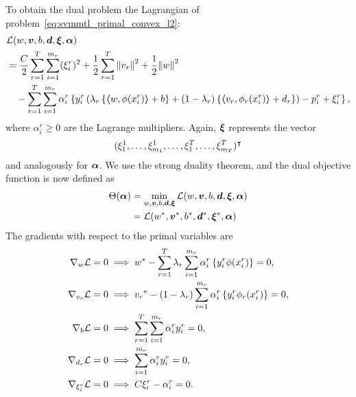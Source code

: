  To obtain the dual problem the Lagrangian of problem~\eqref{eq:svmmtl_primal_convex_l2}:
\begin{equation}\label{eq:svmmtl_lagrangian_convex_l2}
    \begin{aligned}
        & \lagr({w}, \fv{v}, b, \fv{d}, \fv{\xi}, \fv{\alpha}) \\
        &=  \frac{C}{2} \sum_{r= 1}^T \sum_{i=1}^{m_r} ({\xi_{i}^r})^2 + \frac{1}{2} \sum_{r= 1}^T{\norm{{v}_r}^2} + \frac{1}{2} {\norm{{w}}}^2 \\
        &\quad -  \sum_{r= 1}^T \sum_{i=1}^{m_r} \alpha_i^r \left\lbrace y_{i}^r  \left(\lambda_r \left\lbrace \dotp{w}{\phi(x_{i}^r)} + b  \right\rbrace + (1 - \lambda_r) \left\lbrace \dotp{{v}_r}{\phi_r(x_{i}^r)} + d_r \right\rbrace  \right) - p_{i}^r + \xi_{i}^r  \right\rbrace ,
    \end{aligned}
\end{equation}
where $\alpha_i^r \geq 0$ are the Lagrange multipliers. 
Again, $\bm{\xi}$ represents the vector $$(\xi_1^1, \ldots, \xi_{m_1}^1, \ldots, \xi_1^T, \ldots, \xi_{m_T}^T)^\intercal$$ and analogously for $\bm{\alpha}$. 
We use the strong duality theorem, and the dual objective function is now defined as 
\begin{equation}\nonumber
    \begin{aligned}
         \Theta(\bm{\alpha}) &=  \min_{{w}, \bm{v}, b, \bm{d}, \bm{\xi}} \mathcal{L}({w}, \bm{v}, b, \bm{d}, \bm{\xi}, \bm{\alpha}) \\
         &= \mathcal{L}({{w}}^*, {\bm{v}}^*, {b}^*, {\bm{d}}^*, {\bm{\xi}}^*, \bm{\alpha})
    \end{aligned}    
\end{equation}
The gradients with respect to the primal variables are
\begin{align}
    \grad_{{w}} \lagr = 0  &\implies \optim{{w}} - \sum_{r= 1}^\ntasks \lambda_r \sum_{i=1}^{m_r} {\alpha_i^r} \left\lbrace y_i^r \phi(x_i^r) \right\rbrace = 0 , \label{eq:common_repr_conv_l2} \\
    \grad_{{v}_r} \lagr = 0 &\implies \optim{{v}_r} - (1 - \lambda_r) \sum_{i=1}^{m_r} {\alpha_i^r} \left\lbrace y_i^r \phi_r(x_i^r) \right\rbrace = 0 , \label{eq:specific_repr_conv_l2} \\
    \grad_{b} \lagr = 0  &\implies \sum_{r= 1}^T \sum_{i=1}^{m_r} {\alpha_i^r} y_i^r = 0 , \label{eq:specific_eqconstr_conv_l2}  \\
    \grad_{{d}_r} \lagr = 0 &\implies \sum_{i=1}^{m_r} {\alpha_i^r} y_i^r = 0 , \label{eq:common_eqconstr_conv_l2} \\
    \grad_{\xi_i^r} \lagr = 0 &\implies C \xi_i^r - {\alpha_i^r} = 0 . \label{eq:xi_feas_conv_l2}
\end{align}
